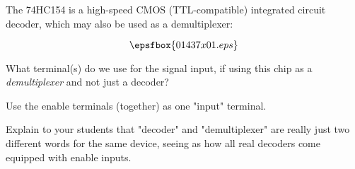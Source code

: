 

The 74HC154 is a high-speed CMOS (TTL-compatible) integrated circuit decoder, which may also be used as a demultiplexer:

$$\epsfbox{01437x01.eps}$$

What terminal(s) do we use for the signal input, if using this chip as a {\it demultiplexer} and not just a decoder?







Use the enable terminals (together) as one "input" terminal.







Explain to your students that "decoder" and "demultiplexer" are really just two different words for the same device, seeing as how all real decoders come equipped with enable inputs.




